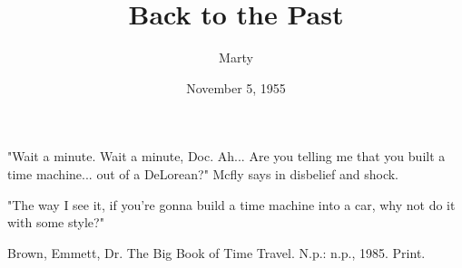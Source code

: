 \documentclass{fcmla}
\title{Back to the Past}
\author{Marty}{McFly}
\date{November 5, 1955}
\begin{document}
\maketitle

"Wait a minute. Wait a minute, Doc. Ah... Are you telling me that you built a time machine... out of a DeLorean?" Mcfly says in disbelief and shock.

"The way I see it, if you're gonna build a time machine into a car, why not do it with some style?" \cite{55}

\begin{thebibliography}{1}
 Brown, Emmett, Dr. The Big Book of Time Travel. N.p.: n.p., 1985. Print.
\end{thebibliography}
\end{document}

